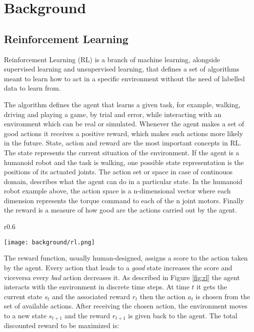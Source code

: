 \chapter{Background}

\section{Reinforcement Learning}

Reinforcement Learning (RL) is a branch of machine learning, alongside supervised learning and unsupervised learning, that defines a set of algorithms meant to learn how to act in a specific environment without the need of labelled data to learn from. 

The algorithm defines the agent that learns a given task, for example, walking, driving and playing a game, by trial and error, while interacting with an environment which can be real or simulated. Whenever the agent makes a set of good actions it receives a positive reward, which makes such actions more likely in the future. State, action and reward are the most important concepts in RL. The state represents the current situation of the environment. If the agent is a humanoid robot and the task is walking, one possible state representation is the positions of its actuated joints. The action set or space in case of continouos domain, describes what the agent can do in a particular state. In the humanoid robot example above, the action space is a n-dimensional vector where each dimension represents the torque command to each of the n joint motors. Finally the reward is a measure of how good are the actions carried out by the agent. 

\begin{wrapfigure}{r}{0.6\textwidth}
  \begin{center}
    \texttt{[image: background/rl.png]}
  \end{center}
  \caption{Basic reinforcement learning}
  \label{fig:rl}
\end{wrapfigure}

The reward function, usually human-designed, assigns a score to the action taken by the agent. Every action that leads to a \textit{good} state increases the score and viceversa every \textit{bad} action decreases it. As described in Figure \ref{fig:rl} the agent interacts with the environment in discrete time steps. At time $t$ it gets the current state $s_{t}$ and the associated reward $r_{t}$ then the action $a_{t}$ is chosen from the set of available actions. After receiving the chosen action, the environment moves to a new state $s_{t+1}$ and the reward $r_{t+1}$ is given back to the agent. The total discounted reward to be maximized is:

